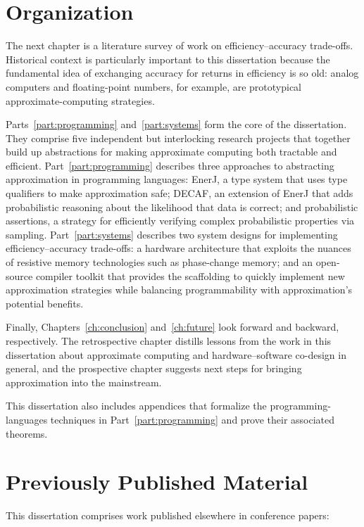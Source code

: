 \section{Organization}

The next chapter is a literature survey of work on efficiency--accuracy
trade-offs.
Historical context is particularly important to this dissertation because the
fundamental idea of exchanging accuracy for returns in efficiency is so old:
analog computers and floating-point numbers, for example, are prototypical
approximate-computing strategies.

Parts~\ref{part:programming} and~\ref{part:systems} form the core of the
dissertation.
They comprise five independent but interlocking research projects that
together build up abstractions for making approximate computing both tractable
and efficient.
%
Part~\ref{part:programming} describes three approaches to abstracting
approximation in programming languages:
EnerJ, a type system that uses type qualifiers to make approximation safe;
DECAF, an extension of EnerJ that adds probabilistic reasoning
about the likelihood that data is correct;
and probabilistic assertions, a strategy for efficiently verifying complex
probabilistic properties via sampling.
%
Part~\ref{part:systems} describes two system designs for implementing
efficiency--accuracy trade-offs:
a hardware architecture that exploits the nuances of resistive memory
technologies such as phase-change memory;
and an open-source compiler toolkit that provides the scaffolding to quickly
implement new approximation strategies while balancing programmability with
approximation's potential benefits.

Finally, Chapters~\ref{ch:conclusion} and~\ref{ch:future} look forward and
backward, respectively.
The retrospective chapter distills lessons from the work in this dissertation
about approximate computing and hardware--software co-design in general, and
the prospective chapter suggests next steps for bringing approximation into
the mainstream.

This dissertation also includes appendices that formalize the
programming-languages techniques in Part~\ref{part:programming} and prove
their associated theorems.


\section{Previously Published Material}

This dissertation comprises work published elsewhere in conference papers:

